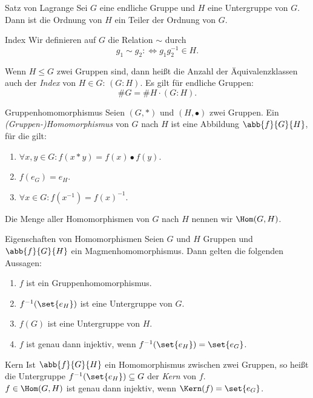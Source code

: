 \begin{karte}{Satz von Lagrange}
    Sei \(G\) eine endliche Gruppe und \(H\) eine Untergruppe von 
    \(G\). Dann ist die Ordnung von \(H\) ein Teiler der Ordnung von \(G\).
\end{karte}

\begin{karte}{Index}
    Wir definieren auf \(G\) die Relation \(\sim\) durch 
    \[ g_1 \sim g_2 :\Leftrightarrow g_1 g_2^{-1} \in H. \]

    Wenn \(H\leq G\) zwei Gruppen sind, dann heißt die Anzahl 
    der Äquivalenzklassen auch der \textit{Index} von \(H\in G\): 
    \((G:H)\). 
    Es gilt für endliche Gruppen: 
    \[ \#G = \#H \cdot (G:H). \]
\end{karte}

\begin{karte}{Gruppenhomomorphismus}
    Seien \((G,*)\) und \((H,\bullet)\) zwei Gruppen. 
    Ein \textit{(Gruppen-)Homomorphismus} von \(G\) nach \(H\) 
    ist eine Abbildung \(\abb{f}{G}{H}\), für die gilt: 
    \begin{enumerate}
        \item \(\forall x,y\in G: f(x*y)= f(x)\bullet f(y)\).
        \item \(f(e_G) = e_H\).
        \item \(\forall x\in G: f(x^{-1}) = f(x)^{-1}\).
    \end{enumerate}

    Die Menge aller Homomorphismen von \(G\) nach \(H\) nennen 
    wir \(\Hom(G,H)\).
\end{karte}

\begin{karte}{Eigenschaften von Homomorphismen}
    Seien \(G\) und \(H\) Gruppen und \(\abb{f}{G}{H}\) ein 
    Magmenhomomorphismus. Dann gelten die folgenden Aussagen:
    \begin{enumerate}
        \item \(f\) ist ein Gruppenhomomorphismus. 
        \item \(f^{-1}(\set{e_H})\) ist eine Untergruppe von \(G\).
        \item \(f(G)\) ist eine Untergruppe von \(H\).
        \item \(f\) ist genau dann injektiv, wenn \(f^{-1}(\set{e_H}) = \set{e_G}\).
    \end{enumerate}
\end{karte}

\begin{karte}{Kern}
    Ist \(\abb{f}{G}{H}\) ein Homomorphismus zwischen zwei Gruppen, 
    so heißt die Untergruppe \(f^{-1}(\set{e_H}) \subseteq G\) der 
    \textit{Kern} von \(f\).\\
    \(f\in \Hom(G,H)\) ist genau dann injektiv, wenn \(\Kern(f) = \set{e_G}\).
\end{karte}


